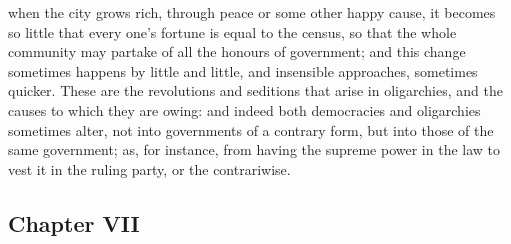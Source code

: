 \documentclass[12pt]{article}
\begin{document}
when the city grows rich, through peace or some other happy cause, it becomes so little that every one's fortune is equal to the census, so that the whole community may partake of all the honours of government; and this change sometimes happens by little and little, and insensible approaches, sometimes quicker. These are the revolutions and seditions that arise in oligarchies, and the causes to which they are owing: and indeed both democracies and oligarchies sometimes alter, not into governments of a contrary form, but into those of the same government; as, for instance, from having the supreme power in the law to vest it in the ruling party, or the contrariwise.

\subsection*{Chapter VII}
\end{document}
